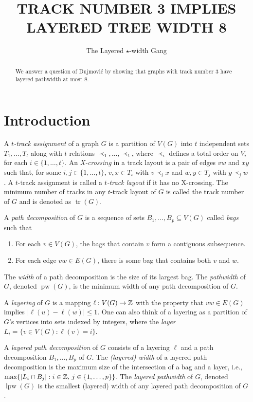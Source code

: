 \documentclass{patmorin}
\title{\MakeUppercase{Track Number 3 Implies Layered Tree Width 8}}
\author{The Layered $\star$-width Gang}%
\DeclareMathOperator{\tr}{tr}
\DeclareMathOperator{\pw}{pw}
\DeclareMathOperator{\lpw}{lpw}
\begin{document}
\maketitle
%
\begin{abstract}
  We answer a question of Dujmovi\'c \etal by showing that graphs with
  track number 3 have layered pathwidth at most 8.
\end{abstract}
%
%


\section{Introduction}

A \emph{$t$-track assignment} of a graph $G$ is a partition of $V(G)$
into $t$ independent sets $T_1,\ldots,T_t$ along with $t$ relations
$\prec_1,\ldots,\prec_t$, where $\prec_i$ defines a total order on $V_i$
for each $i\in\{1,\ldots,t\}$. An \emph{X-crossing} in a track layout is a
pair of edges $vw$ and $xy$ such that, for some $i,j\in\{1,\ldots,t\}$,
$v,x\in T_i$ with $v\prec_i x$ and $w,y\in T_j$ with $y\prec_j w$.
A $t$-track assignment is called a \emph{$t$-track layout} if it has no
X-crossing.  The minimum number of tracks in any $t$-track layout of $G$
is called the track number of $G$ and is denoted as $\tr(G)$.

A \emph{path decomposition} of $G$ is a sequence of sets
$B_1,\ldots,B_p\subseteq V(G)$ called \emph{bags} such that
\begin{enumerate}
   \item For each $v\in V(G)$, the bags that contain $v$ form a contiguous subsequence.
   \item For each edge $vw\in E(G)$, there is some bag that contains both $v$ and $w$.
\end{enumerate}
The \emph{width} of a path decomposition is the size of its largest bag.  The \emph{pathwidth} of $G$, denoted $\pw(G)$, is the minimum width of any path decomposition of $G$.

A \emph{layering} of $G$ is a mapping $\ell:V(G)\to\mathbb{Z}$ with the property
that $vw\in E(G)$ implies $|\ell(u)-\ell(w)|\le 1$. One can also think of
a layering as a partition of $G$'s vertices into sets indexed by integers,
where the \emph{layer} $L_i=\{v\in V(G) : \ell(v)=i\}$.

A \emph{layered path decomposition} of $G$ consists of a layering $\ell$
and a path decomposition $B_1,\ldots,B_p$ of $G$.  The \emph{(layered)
width} of a layered path decomposition is the maximum size of the
intersection of a bag and a layer, i.e., $\max\{|L_i\cap B_j|:i\in\mathbb{Z},\,
j\in\{1,\ldots,p\}\}$.  The \emph{layered pathwidth} of $G$, denoted
$\lpw(G)$ is the smallest (layered) width of any layered path
decomposition of $G$.
\end{document}
